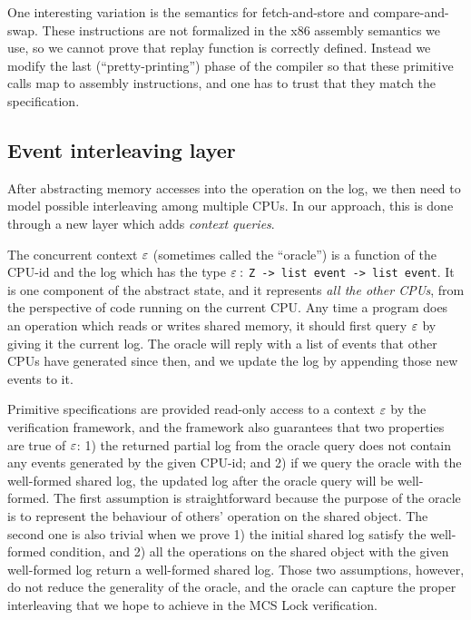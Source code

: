 One interesting variation is the semantics
for fetch-and-store and compare-and-swap. These instructions are not
formalized in the x86 assembly semantics we use, so we cannot prove
that replay function is correctly defined. Instead we modify the last
(``pretty-printing'') phase of the compiler so that these primitive calls map to assembly
instructions, and one has to trust that they match the specification.

\subsection{Event interleaving layer}
\label{subsec:abstractoperationlayer}

After abstracting memory accesses into the operation on the log, we
then need to model possible interleaving among multiple CPUs. In
our approach, this is done through a new layer which adds \emph{context queries}.

The concurrent context ${\varepsilon}$ (sometimes called the ``oracle'') is
a function of the CPU-id and the log which has the type
${\varepsilon}:$ \lstinline$Z -> list event -> list event$.
It is one component of the abstract state, and it represents \emph{all
the other CPUs}, from the perspective of code running on the current
CPU.  Any time a program does an operation which reads or writes
shared memory, it should first query ${\varepsilon}$ by giving it the
current log. The oracle will reply with a list of events that other
CPUs have generated since then, and we update the log by appending
those new events to it.

Primitive specifications are provided read-only access to a context
${\varepsilon}$ by the verification framework, and the framework also
guarantees that two properties are true of ${\varepsilon}$: 1) the returned
partial log from the oracle query does not contain any events
generated by the given CPU-id; and 2) if we query the oracle with the
well-formed shared log, the updated log after the oracle query will
be well-formed.
The first assumption is straightforward because the purpose of the oracle is to represent the behaviour of others' operation on the shared object.
The second one is also trivial when we prove 1) the initial shared log satisfy the well-formed condition, and 2) all the operations on the shared object with the given well-formed log return a well-formed shared log.
Those two assumptions, however, do not reduce the generality of the oracle, and the oracle can capture the proper interleaving that we hope to achieve in the MCS Lock verification.

